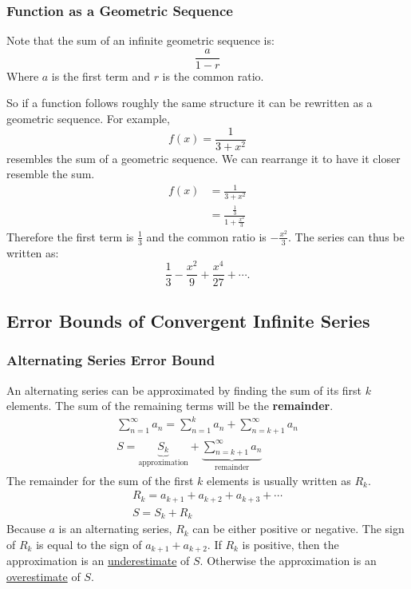 \documentclass[12pt]{article}
\begin{document}
\subsubsection{Function as a Geometric Sequence}
\noindent Note that the sum of an infinite geometric sequence is:
\[ \frac{a}{1-r} \]
Where $a$ is the first term and $r$ is the common ratio.

\noindent So if a function follows roughly the same structure it can be rewritten as a geometric sequence. For example,
\[ f(x) = \frac{1}{3+x^2} \]
resembles the sum of a geometric sequence. We can rearrange it to have it closer resemble the sum.
\begin{align*}
    f(x) & = \frac{1}{3+x^2}                       \\[6pt]
         & = \frac{\frac{1}{3}}{1 + \frac{x^2}{3}}
\end{align*}
Therefore the first term is $\frac{1}{3}$ and the common ratio is $-\frac{x^2}{3}$. The series can thus be written as:
\[ \frac{1}{3} - \frac{x^2}{9} + \frac{x^4}{27} + \cdots. \]

\subsection{Error Bounds of Convergent Infinite Series}
\subsubsection{Alternating Series Error Bound}
An alternating series can be approximated by finding the sum of its first $k$ elements. The sum of the remaining terms will be the \textbf{remainder}.
\begin{gather*}
    \sum_{n=1}^\infty a_n = \sum_{n=1}^k a_n + \sum_{n=k+1}^\infty a_n \\[10pt]
    S = \underbrace{S_k}_{\text{approximation}} + \underbrace{\sum_{n=k+1}^\infty a_n}_{\text{remainder}}
\end{gather*}
The remainder for the sum of the first $k$ elements is usually written as $R_k$.
\begin{gather*}
    R_k = a_{k+1} + a_{k+2} + a_{k+3} + \cdots \\
    S = S_k + R_k
\end{gather*}
Because $a$ is an alternating series, $R_k$ can be either positive or negative. The sign of $R_k$ is equal to the sign of $a_{k+1} + a_{k+2}$. If $R_k$ is positive, then the approximation is an \underline{underestimate} of $S$. Otherwise the approximation is an \underline{overestimate} of $S$.
\end{document}
